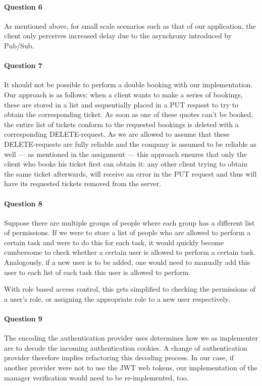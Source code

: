 \documentclass{ds-report}
\begin{document}
	\paragraph{Question 6}
	As mentioned above, for small scale scenarios such as that of our application, the client only perceives increased delay due to the asynchrony introduced by Pub/Sub.
	
	\paragraph{Question 7}
	It should not be possible to perform a double booking with our implementation. Our approach is as follows: when a client wants to make a series of bookings, these are stored in a list and sequentially placed in a PUT request to try to obtain the corresponding ticket. As soon as one of these quotes can't be booked, the entire list of tickets conform to the requested bookings is deleted with a corresponding DELETE-request. As we are allowed to assume that these DELETE-requests are fully reliable and the company is assumed to be reliable as well --- as mentioned in the assignment --- this approach ensures that only the client who books his ticket first can obtain it: any other client trying to obtain the same ticket afterwards, will receive an error in the PUT request and thus will have its requested tickets removed from the server.
	
	\paragraph{Question 8} 
	Suppose there are multiple groups of people where each group has a different list of permissions. If we were to store a list of people who are allowed to perform a certain task and were to do this for each task, it would quickly become cumbersome to check whether a certain user is allowed to perform a certain task. Analogously, if a new user is to be added, one would need to manually add this user to each list of each task this user is allowed to perform.
	
	With role based access control, this gets simplified to checking the permissions of a user's role, or assigning the appropriate role to a new user respectively.
	
	\paragraph{Question 9}
	The encoding the authentication provider uses determines how we as implementer are to decode the incoming authentication cookies. A change of authentication provider therefore implies refactoring this decoding process. In our case, if another provider were not to use the JWT web tokens, our implementation of the manager verification would need to be re-implemented, too.
	
\end{document}
